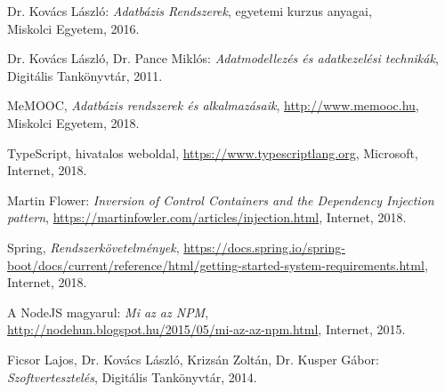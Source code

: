 \begin{thebibliography}{x}
Dr. Kovács László: \emph{Adatbázis Rendszerek}, egyetemi kurzus anyagai, \\
Miskolci Egyetem, 2016.

Dr. Kovács László, Dr. Pance Miklós: \emph{Adatmodellezés és adatkezelési technikák}, Digitális Tankönyvtár, 2011.

MeMOOC, \emph{Adatbázis rendszerek és alkalmazásaik},
\url{http://www.memooc.hu}, \\
Miskolci Egyetem, 2018.

TypeScript, hivatalos weboldal,
\url{https://www.typescriptlang.org}, Microsoft,
Internet, 2018.

Martin Flower: \emph{Inversion of Control Containers and the Dependency Injection pattern},
\url{https://martinfowler.com/articles/injection.html}, Internet, 2018.

Spring, \emph{Rendszerkövetelmények},
\url{https://docs.spring.io/spring-boot/docs/current/reference/html/getting-started-system-requirements.html}, \\
Internet, 2018.

A NodeJS magyarul: \emph{Mi az az NPM}, \\
\url{http://nodehun.blogspot.hu/2015/05/mi-az-az-npm.html},
Internet, 2015.

Ficsor Lajos, Dr. Kovács László, Krizsán Zoltán, Dr. Kusper Gábor: \\
\emph{Szoftvertesztelés},
Digitális Tankönyvtár, 2014.

\end{thebibliography}
